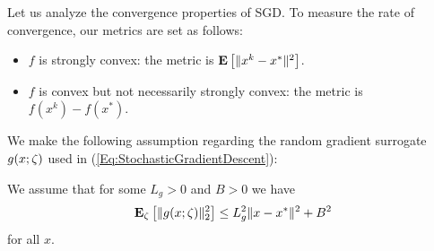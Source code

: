 Let us analyze the convergence properties of SGD. To measure the rate of convergence, our metrics are set as follows:

\begin{itemize}
\item $f$ is strongly convex: the metric is $\mathbf E\left[\|x^k-x^*\|^2\right]$.

\item $f$ is convex but not necessarily strongly convex: the metric is 
$f(x^k)-f(x^*)$.
\end{itemize}

We make the following assumption regarding the random gradient surrogate $g(x; \zeta)$ used in (\ref{Eq:StochasticGradientDescent}):

\begin{assumption}\label{Assumption:SGDBasicAssumption}
We assume that for some $L_g>0$ and $B>0$ we have
\begin{equation}\label{Assumption:SGDBasicAssumption:Eq:Assumption}
\mathbf E_{\zeta}\left[\|g(x;\zeta)\|_2^2\right]\leq L_g^2\|x-x^*\|^2+B^2
\end{equation}
for all $x$.
\end{assumption}

